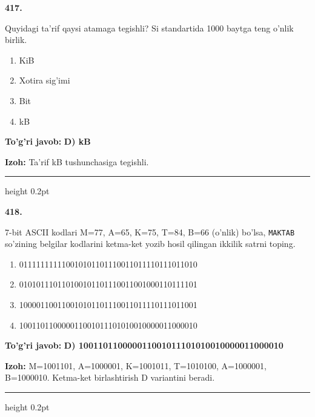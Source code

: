 \documentclass[10pt,a4paper,oneside]{article}
\begin{document}
\noindent\textbf{\color{ink}417.}
\par
Quyidagi ta'rif qaysi atamaga tegishli? Si standartida 1000 baytga teng o'nlik birlik.
\begin{enumerate}[label=\Alph*),leftmargin=9mm]
\item KiB
\item Xotira sig'imi
\item Bit
\item kB
\end{enumerate}
\begin{tcolorbox}[enhanced,breakable,colback=teal!4,colframe=teal!50!black,boxrule=0.5pt,arc=1.1mm,left=3mm,right=3mm,top=1.7mm,bottom=1.7mm,before skip=2mm,after skip=2mm]
\textbf{\color{teal}To'g'ri javob:} \textbf{D) kB}
\par\smallskip
\textbf{Izoh:} Ta'rif kB tushunchasiga tegishli.
\end{tcolorbox}
\vspace{2mm}\hrule height 0.2pt \vspace{3mm}

\noindent\textbf{\color{ink}418.}
\par
7-bit ASCII kodlari M=77, A=65, K=75, T=84, B=66 (o'nlik) bo'lsa, \texttt{MAKTAB} so'zining belgilar kodlarini ketma-ket yozib hosil qilingan ikkilik satrni toping.
\begin{enumerate}[label=\Alph*),leftmargin=9mm]
\item 011111111110010101101110011011110111011010
\item 010101110110100101101110011001000110111101
\item 100001100110010101101110011011110111011001
\item 100110110000011001011101010010000011000010
\end{enumerate}
\begin{tcolorbox}[enhanced,breakable,colback=teal!4,colframe=teal!50!black,boxrule=0.5pt,arc=1.1mm,left=3mm,right=3mm,top=1.7mm,bottom=1.7mm,before skip=2mm,after skip=2mm]
\textbf{\color{teal}To'g'ri javob:} \textbf{D) 100110110000011001011101010010000011000010}
\par\smallskip
\textbf{Izoh:} M=1001101, A=1000001, K=1001011, T=1010100, A=1000001, B=1000010. Ketma-ket birlashtirish D variantini beradi.
\end{tcolorbox}
\vspace{2mm}\hrule height 0.2pt \vspace{3mm}
\end{document}
